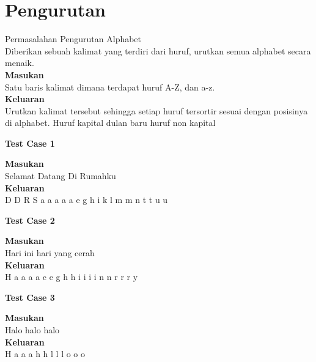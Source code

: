 \chapter{Pengurutan}

\begin{permasalahan}{Permasalahan Pengurutan Alphabet}\\
\label{prob:urutAlphabet}
	Diberikan sebuah kalimat yang terdiri dari huruf, urutkan semua alphabet secara menaik.\\
	\textbf{Masukan}\\
	Satu baris kalimat dimana terdapat huruf A-Z, dan a-z.\\
	\textbf{Keluaran}\\
	Urutkan kalimat tersebut sehingga setiap huruf tersortir sesuai dengan posisinya di alphabet. Huruf kapital dulan baru huruf non kapital\\
	\begin{center}
	\textbf{Test Case 1}\\
	\end{center}
	\textbf{Masukan}\\
	Selamat Datang Di Rumahku\\
	\textbf{Keluaran}\\
	D D R S a a a a a e g h i k l m m n t t u u\\
	\begin{center}
	\textbf{Test Case 2}\\
	\end{center}
	\textbf{Masukan}\\
	Hari ini hari yang cerah\\
	\textbf{Keluaran}\\
	H a a a a c e g h h i i i i n n r r r y\\
	\begin{center}
	\textbf{Test Case 3}\\
	\end{center}
	\textbf{Masukan}\\
	Halo halo halo\\
	\textbf{Keluaran}\\
	H a a a h h l l l o o o\\

\end{permasalahan}

